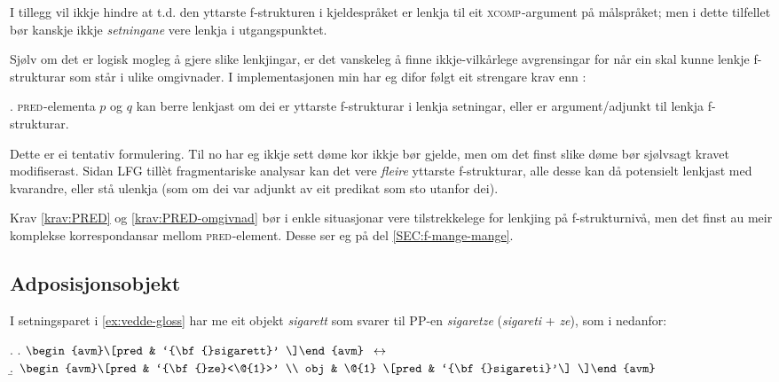 \documentclass[12pt,a4paper,oneside,draft]{report}
\newcommand{\F}[2]{\textsc{#1}\ensuremath{_{#2}}}
\newcommand{\XCOMP}{\F{xcomp}{}}
\newcommand{\PRED}{\F{pred}{}}
\begin{document}
I tillegg vil ikkje \Last hindre at t.d. den yttarste f-strukturen i
kjeldespråket er lenkja til eit \XCOMP{}-argument på målspråket; men i
dette tilfellet bør kanskje ikkje \emph{setningane} vere lenkja i
utgangspunktet.

Sjølv om det er logisk mogleg å gjere slike lenkjingar, er det
vanskeleg å finne ikkje-vilkårlege avgrensingar for når ein skal kunne
lenkje f-strukturar som står i ulike omgivnader. I implementasjonen
min har eg difor følgt eit strengare krav enn \Last[e]:

\ex. \label{krav:PRED-omgivnad} \PRED{}-elementa $p$ og $q$ kan berre
     lenkjast om dei er yttarste f-strukturar i lenkja setningar, eller
     er argument/adjunkt til lenkja f-strukturar.

Dette er ei tentativ formulering. Til no har eg ikkje sett døme kor
\Last ikkje bør gjelde, men om det finst slike døme bør sjølvsagt
kravet modifiserast. Sidan LFG tillèt fragmentariske analysar kan det
vere \emph{fleire} yttarste f-strukturar, alle desse kan då potensielt
lenkjast med kvarandre, eller stå ulenkja (som om dei var adjunkt av
eit predikat som sto utanfor dei).

Krav \ref{krav:PRED} og \ref{krav:PRED-omgivnad} bør i enkle
situasjonar vere tilstrekkelege for lenkjing på f-strukturnivå, men
det finst au meir komplekse korrespondansar mellom \PRED{}-element. Desse
ser eg på del \ref{SEC:f-mange-mange}.


\subsection{Adposisjonsobjekt}
\label{sec-3.6.4}

\label{SEC:adposisjonsobjekt}

 I setningsparet i \ref{ex:vedde-gloss} har me eit objekt \emph{sigarett}
 som svarer til PP-en \emph{sigaretze} (\emph{sigareti} + \emph{ze}), som i \Next
 nedanfor:

{\avmoptions{}
\ex. \a. $\begin{avm}\[pred & `{\bf{}sigarett}' \]\end{avm}\\$
     $\\\leftrightarrow$\\
     \b.     $\begin{avm}\[pred & `{\bf{}ze}<\@{1}>' \\
                 obj & \@{1} \[pred & `{\bf{}sigareti}'\] \]\end{avm}$

}
\end{document}
